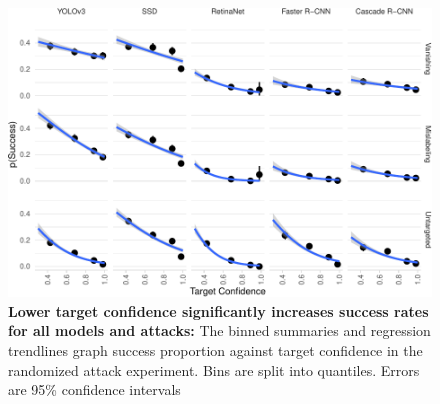 \begin{figure}[tb]

{\centering \includegraphics{imgs/target_conf_graph-1} 

}

\caption{\textbf{Lower target confidence significantly increases success rates for all models and attacks:}  The binned summaries and regression trendlines graph success proportion against target confidence in the randomized attack experiment. Bins are split into quantiles. Errors are 95\% confidence intervals}\label{fig:target_conf_graph}
\end{figure}

\begingroup\fontsize{9}{11}\selectfont

